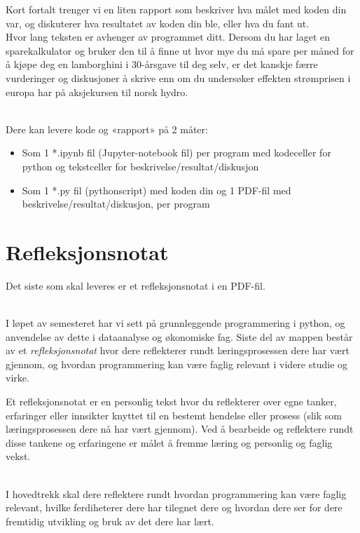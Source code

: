 \documentclass[12pt, titlepage]{article}
\begin{document}
Kort fortalt trenger vi en liten rapport som beskriver hva målet med koden din var, og diskuterer hva resultatet av koden din ble, eller hva du fant ut.\\
Hvor lang teksten er avhenger av programmet ditt. 
Dersom du har laget en sparekalkulator og bruker den til å finne ut hvor mye du må spare per måned for å kjøpe deg en lamborghini i 30-årsgave til deg selv, er det kanskje færre vurderinger og diskusjoner å skrive enn om du undersøker effekten strømprisen i europa har på aksjekursen til norsk hydro.

~\\
Dere kan  levere kode og «rapport» på 2 måter:
\begin{itemize}
   \item {Som 1 *.ipynb fil (Jupyter-notebook fil) per program med kodeceller for python og tekstceller for beskrivelse/resultat/diskusjon}
   \item {Som 1 *.py fil (pythonscript) med koden din og 1 PDF-fil med beskrivelse/resultat/diskusjon, per program}
\end{itemize}


\section*{Refleksjonsnotat}

Det siste som skal leveres er et refleksjonsnotat i en PDF-fil.

~\\
I løpet av semesteret har vi sett på grunnleggende programmering i python, og anvendelse av dette i dataanalyse og økonomiske fag.
Siste del av mappen består av et \textit{refleksjonsnotat} hvor dere reflekterer rundt læringsprosessen dere har vært gjennom, og hvordan programmering kan være faglig relevant i videre studie og virke.

Et refleksjonsnotat er en personlig tekst hvor du reflekterer over egne tanker, erfaringer eller innsikter knyttet til en bestemt hendelse eller prosess (slik som læringsprosessen dere nå har vært gjennom).
Ved å bearbeide og reflektere rundt disse tankene og erfaringene er målet å fremme læring og personlig og faglig vekst.

~\\
I hovedtrekk skal dere reflektere rundt hvordan programmering kan være faglig relevant, hvilke ferdiheterer dere har tilegnet dere og hvordan dere ser for dere fremtidig utvikling og bruk av det dere har lært.\\
\end{document}
